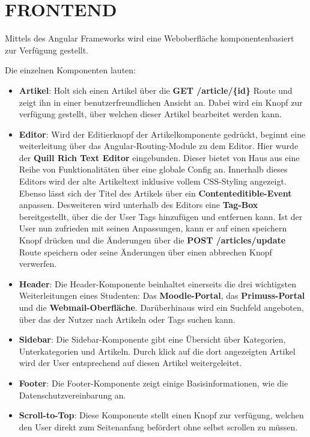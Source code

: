 \section{FRONTEND}\label{ch:frontend}

Mittels des Angular Frameworks wird eine Weboberfläche komponentenbasiert zur Verfügung
gestellt. 

Die einzelnen Komponenten lauten:
\begin{itemize}
\item \textbf{Artikel}: Holt sich einen Artikel über die \textbf{GET /article/\{id\}} Route und zeigt ihn in einer benutzerfreundlichen Ansicht an. Dabei wird ein Knopf zur verfügung gestellt, über welchen dieser Artikel bearbeitet werden kann.
\item \textbf{Editor}: Wird der Editierknopf der Artikelkomponente gedrückt, beginnt eine weiterleitung über das Angular-Routing-Module zu dem Editor. Hier wurde der \textbf{Quill Rich Text Editor} eingebunden. Dieser bietet von Haus aus eine Reihe von Funktionalitäten über eine globale Config an. Innerhalb dieses Editors wird der alte Artikeltext inklusive vollem CSS-Styling angezeigt. Ebenso lässt sich der Titel des Artikels über ein \textbf{Contenteditible-Event} anpassen. Desweiteren wird unterhalb des Editors eine \textbf{Tag-Box} bereitgestellt, über die der User Tags hinzufügen und entfernen kann. Ist der User nun zufrieden mit seinen Anpassungen, kann er auf einen speichern Knopf drücken und die Änderungen über die \textbf{POST /articles/update} Route speichern oder seine Änderungen über einen abbrechen Knopf verwerfen.
\item \textbf{Header}: Die Header-Komponente beinhaltet einerseits die drei wichtigsten Weiterleitungen eines Studenten: Das \textbf{Moodle-Portal}, das \textbf{Primuss-Portal} und die \textbf{Webmail-Oberfläche}. Darüberhinaus wird ein Suchfeld angeboten, über das der Nutzer nach Artikeln oder Tags suchen kann.
\item \textbf{Sidebar}: Die Sidebar-Komponente gibt eine Übersicht über Kategorien, Unterkategorien und Artikeln. Durch klick auf die dort angezeigten Artikel wird der User entsprechend auf diesen Artikel weitergeleitet. 
\item \textbf{Footer}: Die Footer-Komponente zeigt einige Basisinformationen, wie die Datenschutzvereinbarung an. 
\item \textbf{Scroll-to-Top}: Diese Komponente stellt einen Knopf zur verfügung, welchen den User direkt zum Seitenanfang befördert ohne selbst scrollen zu müssen. 
\end{itemize}